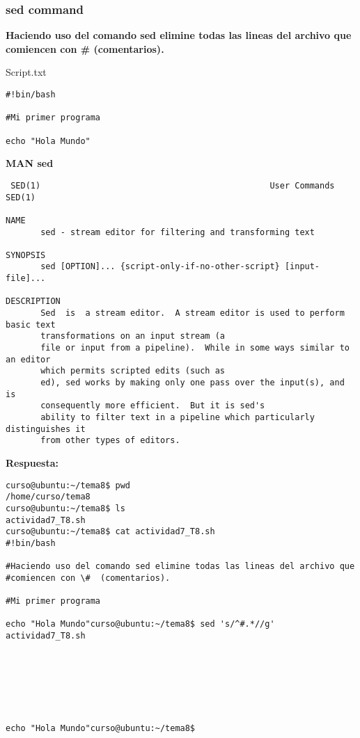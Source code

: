 \documentclass[a4paper,11pt,spanish]{article} %
\newenvironment{myscriptlisting}
{\begin{list}{}{\setlength{\leftmargin}{1em}}\item\scriptsize\bfseries}
{\end{list}}
\begin{document}
\subsubsection{sed command}

\textbf{Haciendo uso del comando sed elimine todas las lineas del archivo que
comiencen con \#  (comentarios).}

Script.txt

\begin{verbatim}
#!bin/bash

#Mi primer programa

echo "Hola Mundo"
\end{verbatim}

\textbf{MAN sed}

\begin{myscriptlisting}
 \begin{verbatim}
 SED(1)                                              User Commands                                              SED(1)

NAME
       sed - stream editor for filtering and transforming text

SYNOPSIS
       sed [OPTION]... {script-only-if-no-other-script} [input-file]...

DESCRIPTION
       Sed  is  a stream editor.  A stream editor is used to perform basic text
       transformations on an input stream (a
       file or input from a pipeline).  While in some ways similar to an editor
       which permits scripted edits (such as
       ed), sed works by making only one pass over the input(s), and is
       consequently more efficient.  But it is sed's
       ability to filter text in a pipeline which particularly distinguishes it
       from other types of editors.
 \end{verbatim}
\end{myscriptlisting}

\textbf{Respuesta:}

\begin{myscriptlisting}
 \begin{verbatim}
curso@ubuntu:~/tema8$ pwd
/home/curso/tema8
curso@ubuntu:~/tema8$ ls
actividad7_T8.sh
curso@ubuntu:~/tema8$ cat actividad7_T8.sh 
#!bin/bash

#Haciendo uso del comando sed elimine todas las lineas del archivo que
#comiencen con \#  (comentarios).

#Mi primer programa

echo "Hola Mundo"curso@ubuntu:~/tema8$ sed 's/^#.*//g' actividad7_T8.sh 







echo "Hola Mundo"curso@ubuntu:~/tema8$ 
 \end{verbatim}
\end{myscriptlisting}
\end{document}
